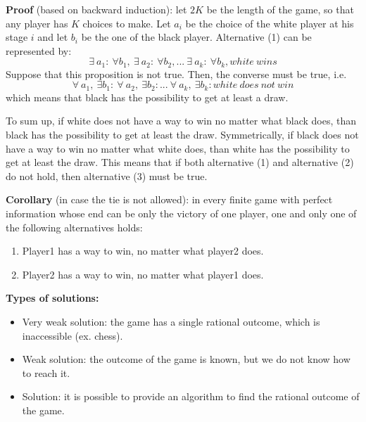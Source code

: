 \documentclass[pt11,a4paper,twoside,reqno,openright]{paper}
\begin{document}
\bigskip
\noindent \textbf{Proof} (based on backward induction): let $2K$ be the length 
of the game, so that any player has $K$ choices to make. Let $a_i$ be the 
choice of the white player at his stage $i$ and let $b_i$ be the one of the 
black player. Alternative (1) can be represented by:
\[
	\exists~a_1: ~\forall b_1, ~\exists~a_2: ~\forall b_2,...
	~\exists~a_k: ~\forall b_k, white~wins
\]
Suppose that this proposition is not true. Then, the converse must be true, 
i.e.
\[
	\forall~a_1, ~\exists b_1: ~\forall~a_2, ~\exists b_2:...
	~\forall~a_k, ~\exists b_k: white~does~not~win
\]
which means that black has the possibility to get at least a draw.

\noindent To sum up, if white does not have a way to win no matter what black 
does, than black has the possibility to get at least the draw. Symmetrically, 
if black does not have a way to win no matter what white does, than white has 
the possibility to get at least the draw. This means that if both alternative 
(1) and alternative (2) do not hold, then alternative (3) must be true.

\bigskip
\noindent \textbf{Corollary} (in case the tie is not allowed): in every finite 
game with perfect information whose end can be only the victory of one player, 
one and only one of the following alternatives holds:
\begin{enumerate}
	\item Player1 has a way to win, no matter what player2 does.
	\item Player2 has a way to win, no matter what player1 does.
\end{enumerate}

\bigskip
\noindent \textbf{Types of solutions:}
\begin{itemize}
	\item Very weak solution: the game has a single rational outcome, which is 
	inaccessible (ex. chess).
	\item Weak solution: the outcome of the game is known, but we do not know 
	how to reach it.
	\item Solution: it is possible to provide an algorithm to find the rational 
	outcome of the game.
\end{itemize}
\end{document}

